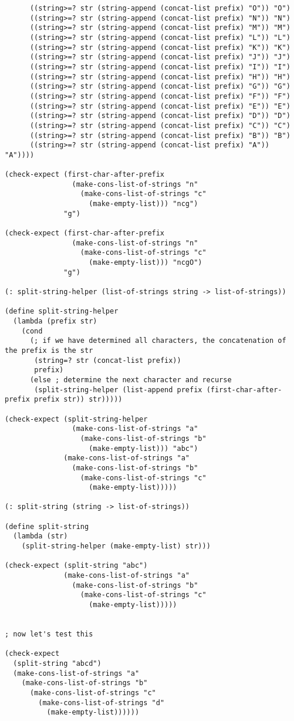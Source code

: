 \documentclass[a4paper,12pt]{article}
\begin{document}
\begin{verbatim}
      ((string>=? str (string-append (concat-list prefix) "O")) "O")
      ((string>=? str (string-append (concat-list prefix) "N")) "N")
      ((string>=? str (string-append (concat-list prefix) "M")) "M")
      ((string>=? str (string-append (concat-list prefix) "L")) "L")
      ((string>=? str (string-append (concat-list prefix) "K")) "K")
      ((string>=? str (string-append (concat-list prefix) "J")) "J")
      ((string>=? str (string-append (concat-list prefix) "I")) "I")
      ((string>=? str (string-append (concat-list prefix) "H")) "H")
      ((string>=? str (string-append (concat-list prefix) "G")) "G")
      ((string>=? str (string-append (concat-list prefix) "F")) "F")
      ((string>=? str (string-append (concat-list prefix) "E")) "E")
      ((string>=? str (string-append (concat-list prefix) "D")) "D")
      ((string>=? str (string-append (concat-list prefix) "C")) "C")
      ((string>=? str (string-append (concat-list prefix) "B")) "B")
      ((string>=? str (string-append (concat-list prefix) "A")) "A"))))

(check-expect (first-char-after-prefix
                (make-cons-list-of-strings "n"
                  (make-cons-list-of-strings "c"
                    (make-empty-list))) "ncg")
              "g")

(check-expect (first-char-after-prefix
                (make-cons-list-of-strings "n"
                  (make-cons-list-of-strings "c"
                    (make-empty-list))) "ncgO")
              "g")

(: split-string-helper (list-of-strings string -> list-of-strings))

(define split-string-helper
  (lambda (prefix str)
    (cond
      (; if we have determined all characters, the concatenation of the prefix is the str
       (string=? str (concat-list prefix))
       prefix)
      (else ; determine the next character and recurse
       (split-string-helper (list-append prefix (first-char-after-prefix prefix str)) str)))))

(check-expect (split-string-helper
                (make-cons-list-of-strings "a"
                  (make-cons-list-of-strings "b"
                    (make-empty-list))) "abc")
              (make-cons-list-of-strings "a"
                (make-cons-list-of-strings "b"
                  (make-cons-list-of-strings "c"
                    (make-empty-list)))))

(: split-string (string -> list-of-strings))

(define split-string
  (lambda (str)
    (split-string-helper (make-empty-list) str)))

(check-expect (split-string "abc")
              (make-cons-list-of-strings "a"
                (make-cons-list-of-strings "b"
                  (make-cons-list-of-strings "c"
                    (make-empty-list)))))


; now let's test this

(check-expect
  (split-string "abcd")
  (make-cons-list-of-strings "a"
    (make-cons-list-of-strings "b"
      (make-cons-list-of-strings "c"
        (make-cons-list-of-strings "d"
          (make-empty-list))))))
\end{verbatim}
\end{document}
